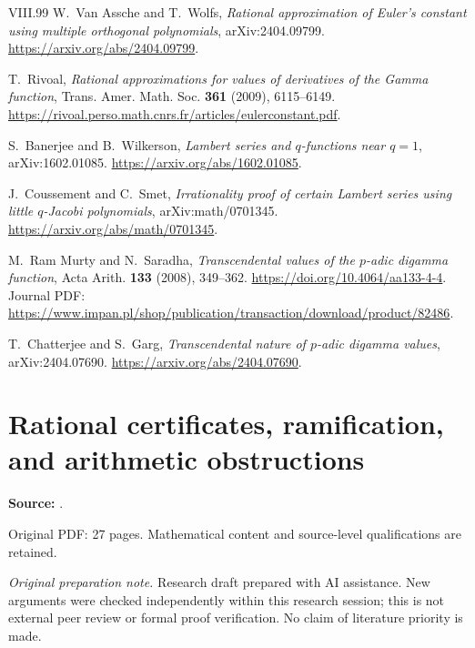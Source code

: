 \documentclass[11pt,a4paper]{article}
\theoremstyle{definition}
\theoremstyle{remark}
\numberwithin{equation}{section}
\renewcommand{\thesection}{\Roman{part}.\arabic{section}}
\renewcommand{\theHsection}{\arabic{part}.main.\arabic{section}}
\begin{document}
\begin{thebibliography}{VIII.99}
W.~Van Assche and T.~Wolfs, \emph{Rational approximation of Euler's
constant using multiple orthogonal polynomials}, arXiv:2404.09799.
\url{https://arxiv.org/abs/2404.09799}.

T.~Rivoal, \emph{Rational approximations for values of derivatives
of the Gamma function}, Trans. Amer. Math. Soc. \textbf{361}
(2009), 6115--6149.
\url{https://rivoal.perso.math.cnrs.fr/articles/eulerconstant.pdf}.

 S.~Banerjee and B.~Wilkerson,
\emph{Lambert series and $q$-functions near $q=1$},
arXiv:1602.01085.
\url{https://arxiv.org/abs/1602.01085}.

 J.~Coussement and C.~Smet,
\emph{Irrationality proof of certain Lambert series using little
$q$-Jacobi polynomials}, arXiv:math/0701345.
\url{https://arxiv.org/abs/math/0701345}.

 M.~Ram Murty and N.~Saradha,
\emph{Transcendental values of the $p$-adic digamma function},
Acta Arith. \textbf{133} (2008), 349--362.
\url{https://doi.org/10.4064/aa133-4-4}.
Journal PDF: \url{https://www.impan.pl/shop/publication/transaction/download/product/82486}.

 T.~Chatterjee and S.~Garg,
\emph{Transcendental nature of $p$-adic digamma values},
arXiv:2404.07690.
\url{https://arxiv.org/abs/2404.07690}.

\end{thebibliography}
\label{part5:end}
\clearpage
\setcounter{section}{0}\setcounter{subsection}{0}
\renewcommand{\thesection}{\Roman{part}.\arabic{section}}
\renewcommand{\theHsection}{\arabic{part}.main.\arabic{section}}
\renewcommand{\refname}{References for Part VI}
\part{Rational certificates, ramification, and arithmetic obstructions}
\label{part6:start}
\noindent\textbf{Source:} {\small{}}.

Original PDF: 27 pages. Mathematical content and source-level qualifications are retained.

\noindent\textit{Original preparation note.} Research draft prepared with AI assistance. New arguments were checked independently within this research session; this is not external peer review or formal proof verification. No claim of literature priority is made.
\end{document}
